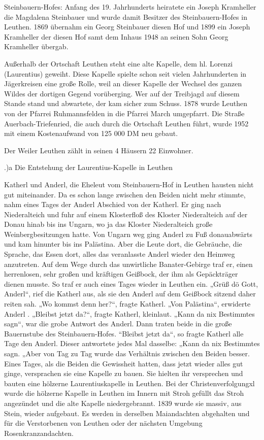 \documentclass{book}
\begin{document}
Steinbauern-Hofes: Anfang des 19. Jahrhunderts heiratete ein Joseph Kramheller
die Magdalena Steinbauer und wurde damit Besitzer des Steinbauern-Hofes in
Leuthen. 1869 übernahm ein Georg Steinbauer diesen Hof und 1899 ein Joseph
Kramheller der diesen Hof samt dem Inhaus 1948 an seinen Sohn Georg Kramheller
übergab.

Außerhalb der Ortschaft Leuthen steht eine alte Kapelle, dem hl. Lorenzi
(Laurentius) geweiht. Diese Kapelle spielte schon seit vielen Jahrhunderten in
Jägerkreisen eine große Rolle, weil an dieser Kapelle der Wechsel des ganzen
Wildes der dortigen Gegend vorüberging. Wer auf der Treibjagd auf diesem Stande
stand und abwartete, der kam sicher zum Schuss. 1878 wurde Leuthen von der
Pfarrei Ruhmannsfelden in die Pfarrei March umgepfarrt. Die Straße
Auerbach-Triefenried, die auch durch die Ortschaft Leuthen führt, wurde 1952 mit
einem Kostenaufwand von 125 000 DM neu gebaut.

Der Weiler Leuthen zählt in seinen 4 Häusern 22 Einwohner.

.)a Die Entstehung der Laurentius-Kapelle in Leuthen

Katherl und Anderl, die Eheleut vom Steinbauern-Hof in Leuthen hausten nicht gut
miteinander. Da es schon lange zwischen den Beiden nicht mehr stimmte, nahm
eines Tages der Anderl Abschied von der Katherl. Er ging nach Niederalteich und
fuhr auf einem Klosterfloß des Kloster Niederalteich auf der Donau hinab bis ins
Ungarn, wo ja das Kloster Niederalteich große Weinbergbesitzungen hatte. Von
Ungarn weg ging Anderl zu Fuß donauabwärts und kam hinunter bis ins Palästina.
Aber die Leute dort, die Gebräuche, die Sprache, das Essen dort, alles das
veranlasste Anderl wieder den Heimweg anzutreten. Auf dem Wege durch das
unwirtliche Banater-Gebirge traf er, einen herrenlosen, sehr großen und
kräftigen Geißbock, der ihm als Gepäckträger dienen musste. So traf er auch
eines Tages wieder in Leuthen ein. „Grüß dö Gott, Anderl“, rief die Katherl aus,
als sie den Anderl auf dem Geißbock sitzend daher reiten sah. „Wo kommst denn
her?“, fragte Katherl. „Von Palästina“, erwiderte Anderl . „Bleibst jetzt da?“,
fragte Katherl, kleinlaut. „Kann da nix Bestimmtes sagn“, war die grobe Antwort
des Anderl. Dann traten beide in die große Bauernstube des Steinbauern-Hofes.
“Bleibst jetzt da“, so fragte Katherl alle Tage den Anderl. Dieser antwortete
jedes Mal dasselbe: „Kann da nix Bestimmtes sagn. „Aber von Tag zu Tag wurde das
Verhältnis zwischen den Beiden besser. Eines Tages, als die Beiden die
Gewissheit hatten, dass jetzt wieder alles gut ginge, versprachen sie eine
Kapelle zu bauen. Sie hielten ihr versprechen und bauten eine hölzerne
Laurentiuskapelle in Leuthen. Bei der Christenverfolgungxl wurde die hölzerne
Kapelle in Leuthen im Innern mit Stroh gefüllt das Stroh angezündet und die alte
Kapelle niedergebrannt. 1839 wurde sie massiv, aus Stein, wieder aufgebaut. Es
werden in derselben Maiandachten abgehalten und für die Verstorbenen von Leuthen
oder der nächsten Umgebung Rosenkranzandachten.
\end{document}
